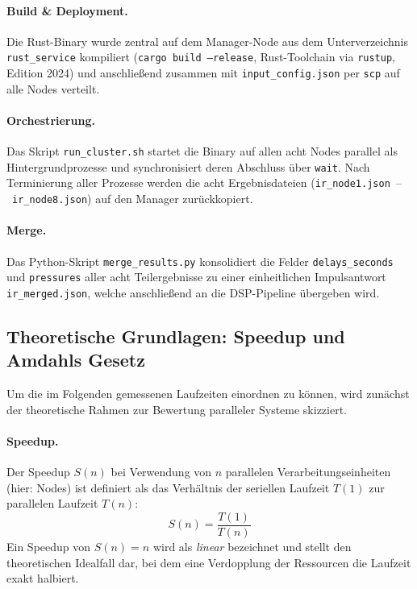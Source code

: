 \paragraph{Build \& Deployment.}
Die Rust-Binary wurde zentral auf dem Manager-Node aus dem Unterverzeichnis
\texttt{rust\_service} kompiliert (\texttt{cargo build --release},
Rust-Toolchain via \texttt{rustup}, Edition 2024) und anschließend
zusammen mit \texttt{input\_config.json} per \texttt{scp} auf alle Nodes
verteilt.

\paragraph{Orchestrierung.}
Das Skript \texttt{run\_cluster.sh} startet die Binary auf allen acht
Nodes parallel als Hintergrundprozesse und synchronisiert deren Abschluss
über \texttt{wait}. Nach Terminierung aller Prozesse werden die acht
Ergebnisdateien (\texttt{ir\_node1.json}~--~\texttt{ir\_node8.json}) auf
den Manager zurückkopiert.

\paragraph{Merge.}
Das Python-Skript \texttt{merge\_results.py} konsolidiert die Felder
\texttt{delays\_seconds} und \texttt{pressures} aller acht Teilergebnisse
zu einer einheitlichen Impulsantwort \texttt{ir\_merged.json}, welche
anschließend an die DSP-Pipeline übergeben wird.

\subsection{Theoretische Grundlagen: Speedup und Amdahls Gesetz}
\label{sec:amdahl}

Um die im Folgenden gemessenen Laufzeiten einordnen zu
können, wird zunächst der theoretische Rahmen zur Bewertung paralleler
Systeme skizziert.

\paragraph{Speedup.}
Der Speedup $S(n)$ bei Verwendung von $n$ parallelen Verarbeitungseinheiten
(hier: Nodes) ist definiert als das Verhältnis der seriellen Laufzeit
$T(1)$ zur parallelen Laufzeit $T(n)$:
\begin{equation}
    S(n) = \frac{T(1)}{T(n)}
    \label{eq:speedup}
\end{equation}
Ein Speedup von $S(n) = n$ wird als \emph{linear} bezeichnet und stellt
den theoretischen Idealfall dar, bei dem eine Verdopplung der Ressourcen
die Laufzeit exakt halbiert.

